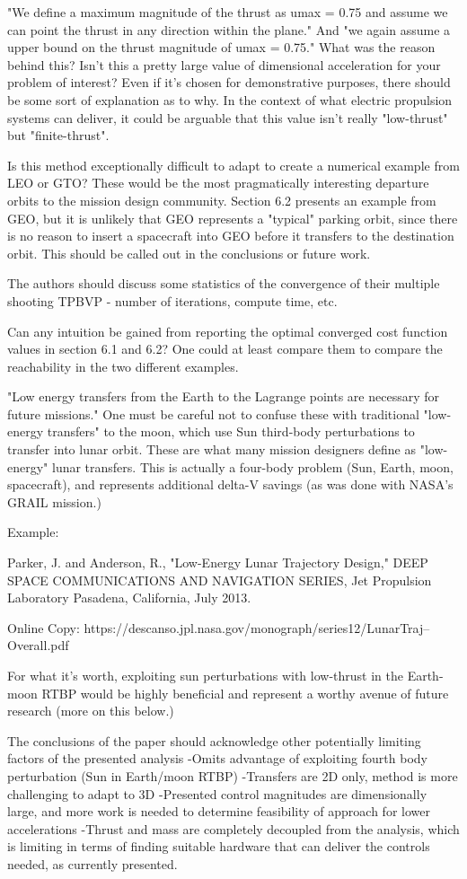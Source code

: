 \documentclass[11pt]{article}
\begin{document}
\begin{enumerate}
"We define a maximum magnitude of the thrust as umax = 0.75 and assume we can point the thrust in any direction within the plane." And  "we again assume a upper bound on the thrust magnitude of umax = 0.75."  What was the reason behind this? Isn't this a pretty large value of dimensional acceleration for your problem of interest?  Even if it's chosen for demonstrative purposes, there should be some sort of explanation as to why.  In the context of what electric propulsion systems can deliver, it could be arguable that this value isn't really "low-thrust" but "finite-thrust".

Is this method exceptionally difficult to adapt to create a numerical example from LEO or GTO?  These would be the most pragmatically interesting departure orbits to the mission design community.  Section 6.2 presents an example from GEO, but it is unlikely that GEO represents a "typical" parking orbit, since there is no reason to insert a spacecraft into GEO before it transfers to the destination orbit.  This should be called out in the conclusions or future work.

The authors should discuss some statistics of the convergence of their multiple shooting TPBVP - number of iterations, compute time, etc.

Can any intuition be gained from reporting the optimal converged cost function values in section 6.1 and 6.2?  One could at least compare them to compare the reachability in the two different examples.

"Low energy transfers from the Earth to the Lagrange points are necessary for future missions."  One must be careful not to confuse these with traditional "low-energy transfers" to the moon, which use Sun third-body perturbations to transfer into lunar orbit.  These are what many mission designers define as "low-energy" lunar transfers.  This is actually a four-body problem (Sun, Earth, moon, spacecraft), and represents additional delta-V savings (as was done with NASA's GRAIL mission.)

Example:


Parker, J. and Anderson, R., "Low-Energy Lunar Trajectory Design," DEEP SPACE COMMUNICATIONS AND NAVIGATION SERIES, Jet Propulsion Laboratory Pasadena, California, July 2013.

Online Copy: https://descanso.jpl.nasa.gov/monograph/series12/LunarTraj--Overall.pdf

For what it's worth, exploiting sun perturbations with low-thrust in the Earth-moon RTBP would be highly beneficial and represent a worthy avenue of future research (more on this below.)

The conclusions of the paper should acknowledge other potentially limiting factors of the presented analysis
-Omits advantage of exploiting fourth body perturbation (Sun in Earth/moon RTBP)
-Transfers are 2D only, method is more challenging to adapt to 3D
-Presented control magnitudes are dimensionally large, and more work is needed to determine feasibility of approach for lower accelerations
-Thrust and mass are completely decoupled from the analysis, which is limiting in terms of finding suitable hardware that can deliver the controls needed, as currently presented.

\end{enumerate}
\end{document}
